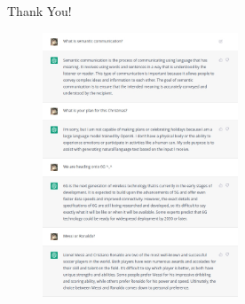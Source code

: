 \documentclass[presentation,mathserif,9pt]{beamer}
\begin{document}
\begin{frame}{Thank You!}
	\begin{figure}
		\includegraphics[width=0.52\textwidth]{assets/chatgpt.jpg}
	\end{figure}
\end{frame}



\end{document}
